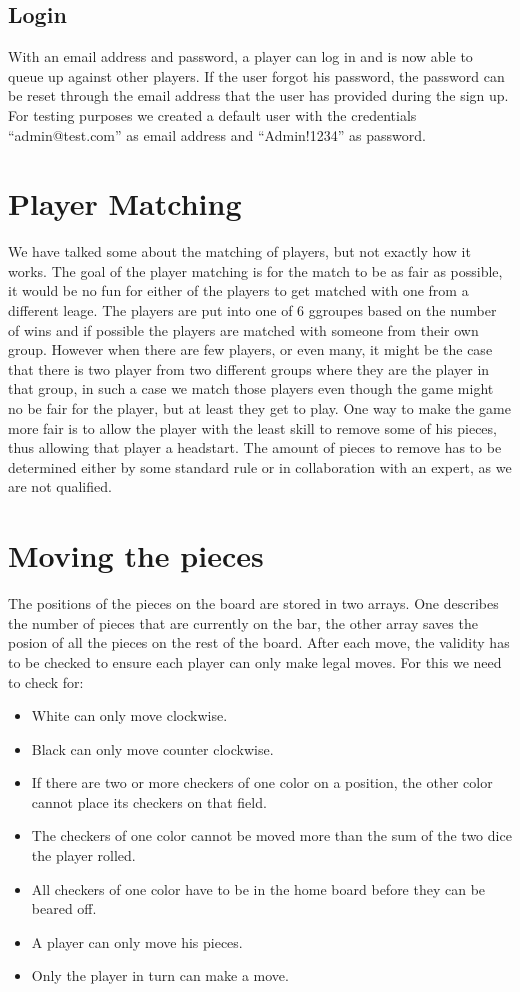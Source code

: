 \documentclass[ twoside,openright,titlepage,numbers=noenddot,headinclude,%
                footinclude=true,cleardoublepage=empty,abstractoff, %
                BCOR=5mm,paper=a4,fontsize=11pt,%
                ngerman,american,%
                ]{scrreprt}
\begin{document}
\subsection{Login}
With an email address and password, a player can log in and is now able to queue up against other players. If the user forgot his password, the password can be reset through the email address that the user has provided during the sign up. \\
For testing purposes we created a default user with the credentials ``admin@test.com'' as email address and ``Admin!1234'' as password.

\section{Player Matching}
We have talked some about the matching of players, but not exactly how it works. The goal of the player matching is for the match to be as fair as possible, it would be no fun for either of the players to get matched with one from a different leage. The players are put into one of 6 ggroupes based on the number of wins and if possible the players are matched with someone from their own group. However when there are few players, or even many, it might be the case that there is two player from two different groups where they are the player in that group, in such a case we match those players even though the game might no be fair for the player, but  at least they get to play. One way to make the game more fair is to allow the player with the least skill to remove some of his pieces, thus allowing that player a headstart. The amount of pieces to remove has to be determined either by some standard rule or in collaboration with an expert, as we are not qualified.


\section{Moving the pieces}
The positions of the pieces on the board are stored in two arrays. One describes the number of pieces that are currently on the bar, the other array saves the posion of all the pieces on the rest of the board. 
After each move, the validity has to be checked to ensure each player can only make legal moves. 
For this we need to check for:
\begin{itemize}
  \item White can only move clockwise.
  \item Black can only move counter clockwise.
  \item If there are two or more checkers of one color on a position, the other color cannot place its checkers on that field. 
  \item The checkers of one color cannot be moved more than the sum of the two dice the player rolled.
  \item All checkers of one color have to be in the home board before they can be beared off. 
  \item A player can only move his pieces.
  \item Only the player in turn can make a move.
\end{itemize}
\end{document}

